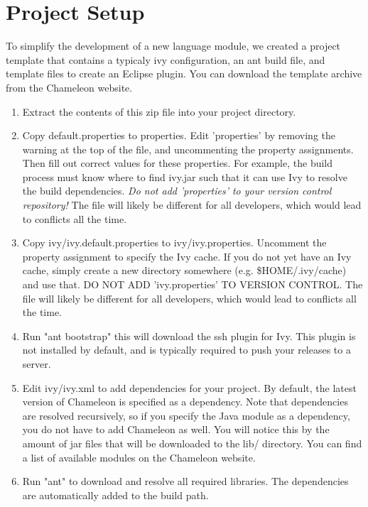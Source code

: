 \chapter{Project Setup}

To simplify the development of a new language module, we created a project template that contains a typicaly ivy configuration, an ant build file, and template files to create an Eclipse plugin. You can download the template archive from the Chameleon website.

\begin{enumerate}
\item Extract the contents of this zip file into your project directory.

\item Copy default.properties to properties. Edit 'properties' by removing the warning at the top of the file, and uncommenting the property assignments. Then fill out correct values for these properties. For example, the build process must know where to find ivy.jar such that it can use Ivy to resolve the build dependencies. \emph{Do not add 'properties' to your version control repository!} The file will likely be different for all developers, which would lead to conflicts all the time.

\item Copy ivy/ivy.default.properties to ivy/ivy.properties. Uncomment the property assignment to specify the Ivy cache. If you do not yet have an Ivy cache, simply create a new directory somewhere (e.g. \$HOME/.ivy/cache) and use that. DO NOT ADD 'ivy.properties' TO VERSION CONTROL. The file will likely be different for all developers, which would lead to conflicts all the time.
 
\item Run "ant bootstrap" this will download the ssh plugin for Ivy. This plugin is not installed by default, and is typically required to push your releases to a server.

\item Edit ivy/ivy.xml to add dependencies for your project. By default, the latest version of Chameleon is specified as a dependency. Note that dependencies are resolved recursively, so if you specify the Java module as a dependency, you do not have to add Chameleon as well. You will notice this by the amount of jar files that will be downloaded to the lib/ directory. You can find a list of available modules on the Chameleon website.

\item Run "ant" to download and resolve all required libraries. The dependencies are automatically added to the build path.
\end{enumerate}